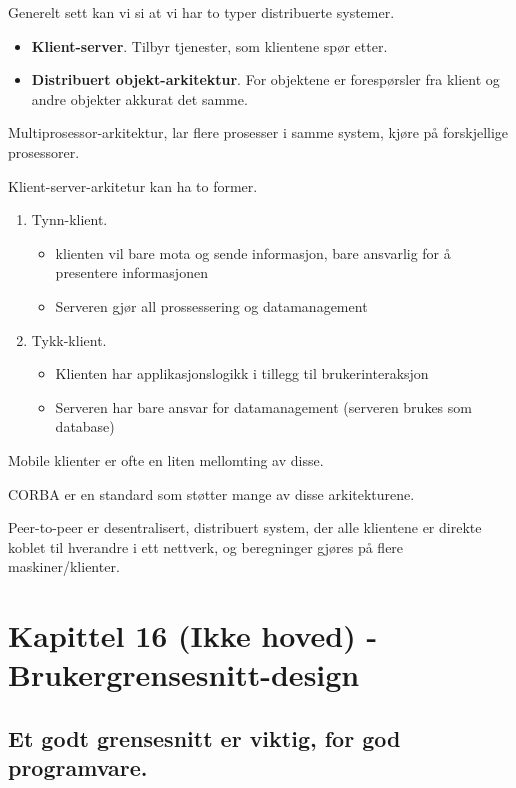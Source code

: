 \documentclass[11pt]{article}
\begin{document}
  Generelt sett kan vi si at vi har to typer distribuerte systemer.

\begin{itemize}
\item \textbf{Klient-server}. Tilbyr tjenester, som klientene spør etter.
\item \textbf{Distribuert objekt-arkitektur}. For objektene er forespørsler 
    fra klient og andre objekter akkurat det samme.
\end{itemize}

  Multiprosessor-arkitektur, lar flere prosesser i samme system, kjøre på forskjellige prosessorer.

  Klient-server-arkitetur kan ha to former.

\begin{enumerate}
\item Tynn-klient.

\begin{itemize}
\item klienten vil bare mota og sende informasjon, bare ansvarlig for å presentere informasjonen
\item Serveren gjør all prossessering og datamanagement
\end{itemize}

\item Tykk-klient.

\begin{itemize}
\item Klienten har applikasjonslogikk i tillegg til brukerinteraksjon
\item Serveren har bare ansvar for datamanagement (serveren brukes som database)
\end{itemize}

\end{enumerate}

  Mobile klienter er ofte en liten mellomting av disse.

  CORBA er en standard som støtter mange av disse arkitekturene.

  Peer-to-peer er desentralisert, distribuert system, der alle klientene er direkte
  koblet til hverandre i ett nettverk, og beregninger gjøres på flere maskiner/klienter.
\section{Kapittel 16 (Ikke hoved) - Brukergrensesnitt-design}
\label{sec-14}
\subsection{Et godt grensesnitt er viktig, for god programvare.}
\label{sec-14.1}
\end{document}
